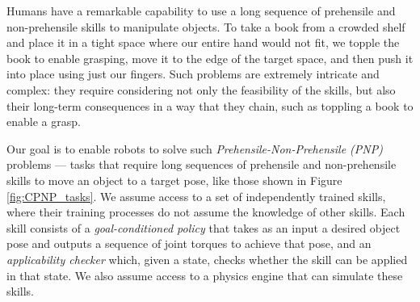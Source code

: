 
Humans have a remarkable capability to use a long sequence of prehensile and non-prehensile skills to manipulate objects. To take a book from a crowded shelf and place it in a tight space where our entire hand would not fit, we topple the book to enable grasping, move it to the edge of the target space, and then push it into place using just our fingers. Such problems are extremely intricate and complex: they require considering not only the feasibility of the skills, but also their long-term consequences in a way that they chain, such as toppling a book to enable a grasp.

Our goal is to enable robots to solve such \textit{Prehensile-Non-Prehensile (PNP)} problems — tasks that require long sequences of prehensile and non-prehensile skills to move an object to a target pose, like those shown in Figure \ref{fig:CPNP_tasks}. We assume access to a set of independently trained skills, where their training processes do not assume the knowledge of other skills. Each skill consists of a \emph{goal-conditioned policy} that takes as an input a desired object pose and outputs a sequence of joint torques to achieve that pose, and an \emph{applicability checker} which, given a state, checks whether the skill can be applied in that state. We also assume access to a physics engine that can simulate these skills.

